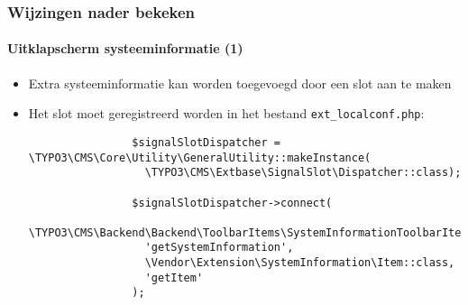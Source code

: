 \begin{frame}[fragile]
	\frametitle{Wijzingen nader bekeken}
	\framesubtitle{Uitklapscherm systeeminformatie (1)}

	\lstset{basicstyle=\tiny\ttfamily}

	\begin{itemize}
		\item Extra systeeminformatie kan worden toegevoegd door een slot aan te maken

		\item Het slot moet geregistreerd worden in het bestand \texttt{ext\_localconf.php}:

			\begin{lstlisting}
				$signalSlotDispatcher = \TYPO3\CMS\Core\Utility\GeneralUtility::makeInstance(
				  \TYPO3\CMS\Extbase\SignalSlot\Dispatcher::class);

				$signalSlotDispatcher->connect(
				  \TYPO3\CMS\Backend\Backend\ToolbarItems\SystemInformationToolbarItem::class,
				  'getSystemInformation',
				  \Vendor\Extension\SystemInformation\Item::class,
				  'getItem'
				);
			\end{lstlisting}

	\end{itemize}

\end{frame}

